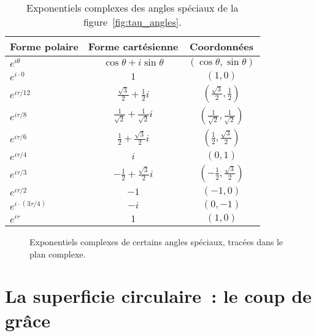 \begin{table}
\begin{center}
\begin{tabular}{lcc}
Forme polaire & Forme cartésienne & Coordonnées \\ \hline\hline
$e^{i\theta}$ & $\cos\theta + i\sin\theta$ & $(\cos\theta, \sin\theta)$ \\ \hline
$e^{i\cdot0}$ & $1$ & $(1, 0)$ \smallskip \\
$e^{i\tau/12}$ & $\frac{\sqrt{3}}{2} + \frac{1}{2}i$ & $(\frac{\sqrt{3}}{2}, \frac{1}{2})$ \smallskip \\
$e^{i\tau/8}$ & $\frac{1}{\sqrt{2}} +  \frac{1}{\sqrt{2}}i$ & $(\frac{1}{\sqrt{2}}, \frac{1}{\sqrt{2}})$ \smallskip \\
$e^{i\tau/6}$ & $\frac{1}{2} +\frac{\sqrt{3}}{2} i$ & $(\frac{1}{2}, \frac{\sqrt{3}}{2})$ \smallskip \\
$e^{i\tau/4}$ & $i$ & $(0, 1)$ \smallskip \\
$e^{i\tau/3}$ & $-\frac{1}{2} +\frac{\sqrt{3}}{2} i$ & $(-\frac{1}{2}, \frac{\sqrt{3}}{2})$ \smallskip \\
$e^{i\tau/2}$ & $-1$ & $(-1, 0)$ \smallskip \\
$e^{i\cdot(3\tau/4)}$ & $-i$ & $(0, -1)$ \smallskip \\
$e^{i\tau}$ & $1$ & $(1, 0)$
\end{tabular}
\end{center}
\caption{Exponentiels complexes des angles spéciaux de la figure~\ref{fig:tau_angles}.\label{table:complex_exponentials}}
\end{table}

\begin{figure}
\begin{center}
\end{center}
\caption{Exponentiels complexes de certains angles spéciaux, tracées dans le plan complexe.\label{fig:tau_euler_circle}}
\end{figure}


\section{La superficie circulaire~: le coup de grâce} %
\label{sec:circular_area}


